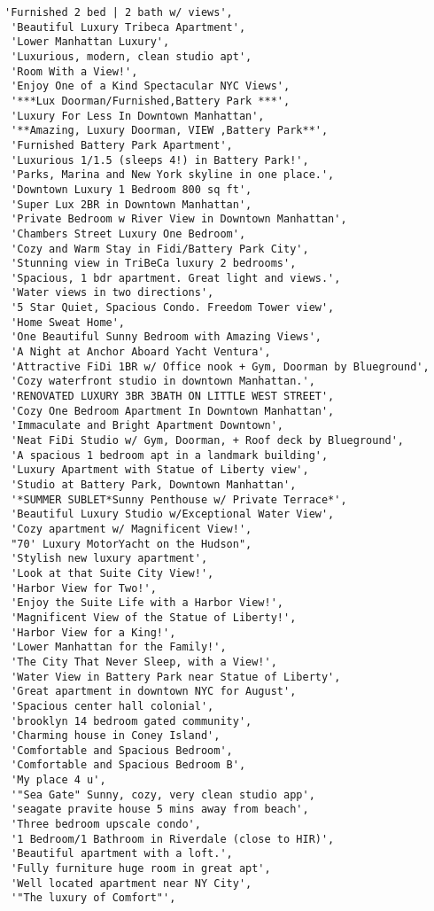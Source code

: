 \documentclass[11pt]{article}
\begin{document}
\begin{tcolorbox}[breakable, size=fbox, boxrule=.5pt, pad at break*=1mm, opacityfill=0]
\begin{Verbatim}[commandchars=\\\{\}]
 'Furnished 2 bed | 2 bath w/ views',
 'Beautiful Luxury Tribeca Apartment',
 'Lower Manhattan Luxury',
 'Luxurious, modern, clean studio apt',
 'Room With a View!',
 'Enjoy One of a Kind Spectacular NYC Views',
 '***Lux Doorman/Furnished,Battery Park ***',
 'Luxury For Less In Downtown Manhattan',
 '**Amazing, Luxury Doorman, VIEW ,Battery Park**',
 'Furnished Battery Park Apartment',
 'Luxurious 1/1.5 (sleeps 4!) in Battery Park!',
 'Parks, Marina and New York skyline in one place.',
 'Downtown Luxury 1 Bedroom 800 sq ft',
 'Super Lux 2BR in Downtown Manhattan',
 'Private Bedroom w River View in Downtown Manhattan',
 'Chambers Street Luxury One Bedroom',
 'Cozy and Warm Stay in Fidi/Battery Park City',
 'Stunning view in TriBeCa luxury 2 bedrooms',
 'Spacious, 1 bdr apartment. Great light and views.',
 'Water views in two directions',
 '5 Star Quiet, Spacious Condo. Freedom Tower view',
 'Home Sweat Home',
 'One Beautiful Sunny Bedroom with Amazing Views',
 'A Night at Anchor Aboard Yacht Ventura',
 'Attractive FiDi 1BR w/ Office nook + Gym, Doorman by Blueground',
 'Cozy waterfront studio in downtown Manhattan.',
 'RENOVATED LUXURY 3BR 3BATH ON LITTLE WEST STREET',
 'Cozy One Bedroom Apartment In Downtown Manhattan',
 'Immaculate and Bright Apartment Downtown',
 'Neat FiDi Studio w/ Gym, Doorman, + Roof deck by Blueground',
 'A spacious 1 bedroom apt in a landmark building',
 'Luxury Apartment with Statue of Liberty view',
 'Studio at Battery Park, Downtown Manhattan',
 '*SUMMER SUBLET*Sunny Penthouse w/ Private Terrace*',
 'Beautiful Luxury Studio w/Exceptional Water View',
 'Cozy apartment w/ Magnificent View!',
 "70' Luxury MotorYacht on the Hudson",
 'Stylish new luxury apartment',
 'Look at that Suite City View!',
 'Harbor View for Two!',
 'Enjoy the Suite Life with a Harbor View!',
 'Magnificent View of the Statue of Liberty!',
 'Harbor View for a King!',
 'Lower Manhattan for the Family!',
 'The City That Never Sleep, with a View!',
 'Water View in Battery Park near Statue of Liberty',
 'Great apartment in downtown NYC for August',
 'Spacious center hall colonial',
 'brooklyn 14 bedroom gated community',
 'Charming house in Coney Island',
 'Comfortable and Spacious Bedroom',
 'Comfortable and Spacious Bedroom B',
 'My place 4 u',
 '"Sea Gate" Sunny, cozy, very clean studio app',
 'seagate pravite house 5 mins away from beach',
 'Three bedroom upscale condo',
 '1 Bedroom/1 Bathroom in Riverdale (close to HIR)',
 'Beautiful apartment with a loft.',
 'Fully furniture huge room in great apt',
 'Well located apartment near NY City',
 '"The luxury of Comfort"',

\end{Verbatim}
\end{tcolorbox}
\end{document}
